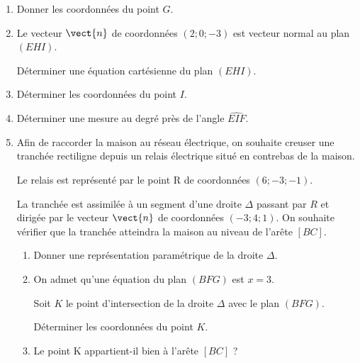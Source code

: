 \begin{enumerate}
	\item Donner les coordonnées du point $G$.
	\item Le vecteur $\vect{n}$ de coordonnées $(2;0;-3)$ est vecteur normal au plan $(EHI)$.
	
	Déterminer une équation cartésienne du plan $(EHI)$.
	\item Déterminer les coordonnées du point $I$.
	\item Déterminer une mesure au degré près de l'angle $\widehat{EIF}$.
	\item Afin de raccorder la maison au réseau électrique, on souhaite creuser une tranchée rectiligne depuis un relais électrique situé en contrebas de la maison.
	
	Le relais est représenté par le point R de coordonnées $(6;-3;-1)$.
	
	La tranchée est assimilée à un segment d'une droite $\Delta$ passant par $R$ et dirigée par le vecteur $\vect{n}$ de coordonnées $(-3;4;1)$. On souhaite vérifier que la tranchée atteindra la maison au niveau de l'arête $[BC]$.
	\begin{enumerate}
		\item Donner une représentation paramétrique de la droite $\Delta$.
		\item On admet qu'une équation du plan $(BFG)$ est $x = 3$.
		
		Soit $K$ le point d'intersection de la droite $\Delta$ avec le plan $(BFG)$.
		
		Déterminer les coordonnées du point $K$.
		\item Le point K appartient-il bien à l'arête $[BC]$ ?
	\end{enumerate}
\end{enumerate}

